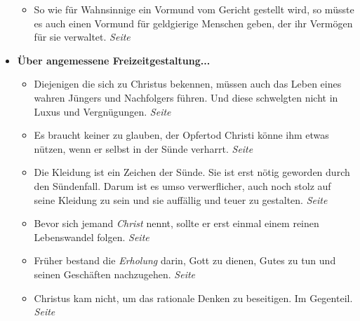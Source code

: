 \begin{itemize}
\begin{itemize}
 \item So wie für Wahnsinnige ein Vormund vom Gericht gestellt wird, so
müsste es auch einen Vormund für geldgierige Menschen geben, der ihr Vermögen für
sie verwaltet.
 \dotfill \textit{Seite~\pageref{ref:13_22_wahnsinnige}}\\

 \end{itemize}

 \item \textbf{Über angemessene Freizeitgestaltung...}

\begin{itemize}
 \item Diejenigen die sich zu Christus bekennen, müssen auch das Leben eines
wahren Jüngers und Nachfolgers führen. Und diese schwelgten nicht in Luxus und
Vergnügungen.
 \dotfill \textit{Seite~\pageref{ref:14_01_wahre_nachfolger}}\\

 \item Es braucht keiner zu glauben, der Opfertod Christi könne ihm etwas
nützen, wenn er selbst in der Sünde verharrt.
 \dotfill \textit{Seite~\pageref{ref:14_01_wahre_nachfolger_suenetod}}\\

 \item Die Kleidung ist ein Zeichen der Sünde. Sie ist erst nötig geworden durch
den Sündenfall. Darum ist es umso verwerflicher, auch noch stolz auf seine
Kleidung zu sein und sie auffällig und teuer zu gestalten.
 \dotfill \textit{Seite~\pageref{ref:14_04_wahre_nachfolger_kleidung}}\\

 \item Bevor sich jemand \textit{Christ} nennt, sollte er erst einmal einem reinen
Lebenswandel folgen.
 \dotfill \textit{Seite~\pageref{ref:14_06_wahre_nachfolger_umkehr}}\\

 \item Früher bestand die \textit{Erholung} darin, Gott zu dienen, Gutes zu tun
und seinen Geschäften nachzugehen.
 \dotfill \textit{Seite~\pageref{ref:14_07_wahre_nachfolger_erholung}}\\

 \item Christus kam nicht, um das rationale Denken zu beseitigen. Im Gegenteil.
 \dotfill \textit{Seite~\pageref{ref:14_08_wahre_nachfolger_rational}}\\


\end{itemize}
\end{itemize}
